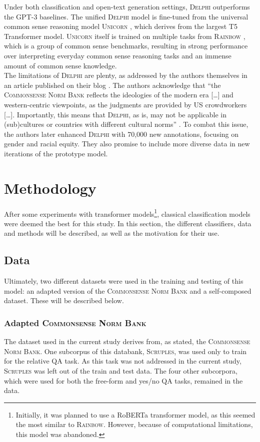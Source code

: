 \documentclass[final]{clv3} %
\begin{document}
Under both classification and open-text generation settings, \textsc{Delphi} outperforms the GPT-3 baselines. The unified \textsc{Delphi} model is fine-tuned from the universal common sense reasoning model \textsc{Unicorn} \cite{lourie}, which derives from the largest T5 Transformer model. \textsc{Unicorn} itself is trained on multiple tasks from \textsc{Rainbow} \cite{lourie}, which is a group of common sense benchmarks, resulting in strong performance over interpreting everyday common sense reasoning tasks and an immense amount of common sense knowledge.\\

The limitations of \textsc{Delphi} are plenty, as addressed by the authors themselves in an article published on their blog \cite{jiang-blog}. The authors acknowledge that “the \textsc{Commonsense Norm Bank} reflects the ideologies of the modern era […] and western-centric viewpoints, as the judgments are provided by US crowdworkers […]. Importantly, this means that \textsc{Delphi}, as is, may not be applicable in (sub)cultures or countries with different cultural norms” \cite{jiang-blog}. To combat this issue, the authors later enhanced \textsc{Delphi} with 70,000 new annotations, focusing on gender and racial equity. They also promise to include more diverse data in new iterations of the prototype model. 

\section{Methodology}

After some experiments with transformer models\footnote{Initially, it was planned to use a RoBERTa transformer model, as this seemed the most similar to \textsc{Rainbow}. However, because of computational limitations, this model was abandoned.}, classical classification models were deemed the best for this study. In this section, the different classifiers, data and methods will be described, as well as the motivation for their use.

\subsection{Data}
Ultimately, two different datasets were used in the training and testing of this model: an adapted version of the \textsc{Commonsense Norm Bank} and a self-composed dataset. These will be described below.

\subsubsection{Adapted \textsc{Commonsense Norm Bank}}
The dataset used in the current study derives from, as stated, the \textsc{Commonsense Norm Bank}. One subcorpus of this databank, \textsc{Scruples}, was used only to train for the relative QA task. As this task was not addressed in the current study, \textsc{Scruples} was left out of the train and test data. The four other subcorpora, which were used for both the free-form and yes/no QA tasks, remained in the data.
\end{document}
